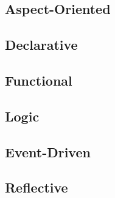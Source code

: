 
\subsection{Aspect-Oriented}


\subsection{Declarative}


\subsection{Functional}


\subsection{Logic}


\subsection{Event-Driven}


\subsection{Reflective}
